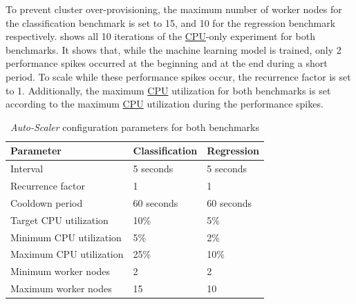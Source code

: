 To prevent cluster over-provisioning, the maximum number of worker nodes for the classification benchmark is set to 15, and 10 for the regression benchmark respectively.
 shows all 10 iterations of the \hyperlink{abbr:cpu}{CPU}-only experiment for both benchmarks. It shows that, while the machine learning model is trained, only 2 performance spikes occurred at the beginning and at the end during a short period. To scale while these performance spikes occur, the recurrence factor is set to 1. Additionally, the maximum \hyperlink{abbr:cpu}{CPU} utilization for both benchmarks is set according to the maximum \hyperlink{abbr:cpu}{CPU} utilization during the performance spikes.
\begin{table}[ht]
\centering
\begin{tabular}{@{}l|ll@{}}
\toprule
Parameter               & Classification & Regression \\ \midrule
Interval                & 5 seconds      & 5 seconds  \\
Recurrence factor       & 1              & 1          \\
Cooldown period         & 60 seconds     & 60 seconds \\
Target CPU utilization  & 10\%           & 5\%        \\
Minimum CPU utilization & 5\%            & 2\%       \\
Maximum CPU utilization & 25\%           & 10\%       \\
Minimum worker nodes    & 2              & 2         \\
Maximum worker nodes    & 15             & 10         \\ \bottomrule
\end{tabular}
\caption{\textit{Auto-Scaler} configuration parameters for both benchmarks}
\label{table:07_auto-scaler_config_parameter}
\end{table}

\newpage
